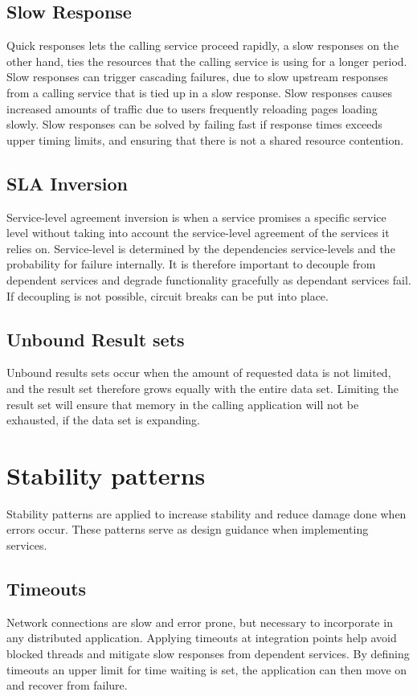 \subsection{Slow Response}
Quick responses lets the calling service proceed rapidly, a slow responses on the other hand, ties the resources that the calling service is using for a longer period. Slow responses can trigger cascading failures, due to slow upstream responses from a calling service that is tied up in a slow response. Slow responses causes increased amounts of traffic due to users frequently reloading pages loading slowly. Slow responses can be solved by failing fast if response times exceeds upper timing limits, and ensuring that there is not a shared resource contention.

\subsection{SLA Inversion}
Service-level agreement inversion is when a service promises a specific service level without taking into account the service-level agreement of the services it relies on. Service-level is determined by the dependencies service-levels and the probability for failure internally. It is therefore important to decouple from dependent services and degrade functionality gracefully as dependant services fail. If decoupling is not possible, circuit breaks can be put into place. 

\subsection{Unbound Result sets}
Unbound results sets occur when the amount of requested data is not limited, and the result set therefore grows equally with the entire data set. Limiting the result set will ensure that memory in the calling application will not be exhausted, if the data set is expanding.


\section{Stability patterns}
Stability patterns are applied to increase stability and reduce damage done when errors occur. These patterns serve as design guidance when implementing services.


\subsection{Timeouts}
Network connections are slow and error prone, but necessary to incorporate in any distributed application. Applying timeouts at integration points help avoid blocked threads and mitigate slow responses from dependent services. By defining timeouts an upper limit for time waiting is set, the application can then move on and recover from failure.


